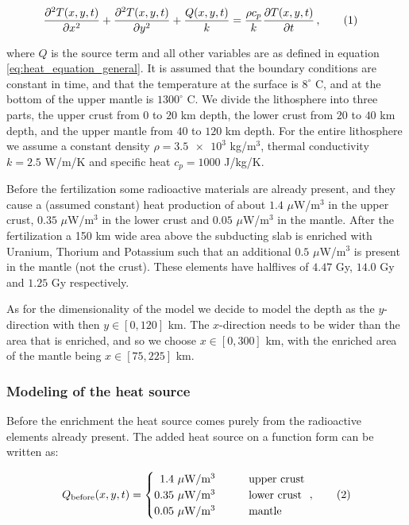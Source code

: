 \documentclass[reprint,english,notitlepage]{revtex4-1}  %
\newcommand\numberthis{\addtocounter{equation}{1}\tag{\theequation}}
\begin{document}
\begin{align*}
\frac{\partial^2 T(x,y,t)}{\partial x^2} + \frac{\partial^2 T(x,y,t)}{\partial y^2} + \frac{Q(x,y,t)}{k} &= \frac{\rho c_p}{k} \frac{\partial T(x,y,t)}{\partial t} \, , \numberthis \label{eq:heat_eq_with_source_term}
\end{align*} 

where $Q$ is the source term and all other variables are as defined in equation \eqref{eq:heat_equation_general}. It is assumed that the boundary conditions are constant in time, and that the temperature at the surface is $8^\circ$ C, and at the bottom of the upper mantle is $1300^\circ$ C. We divide the lithosphere into three parts, the upper crust from $0$ to $20$ km depth, the lower crust from $20$ to $40$ km depth, and the upper mantle from $40$ to $120$ km depth. For the entire lithosphere we assume a constant density $\rho = \num{3.5e3}$ kg/m$^3$, thermal conductivity $k = 2.5$ W/m/K and specific heat $c_p = 1000$ J/kg/K.

Before the fertilization some radioactive materials are already present, and they cause a (assumed constant) heat production of about $1.4$ $\mu$W/m$^3$ in the upper crust, $0.35$ $\mu$W/m$^3$ in the lower crust and $0.05$ $\mu$W/m$^3$ in the mantle. After the fertilization a 150 km wide area above the subducting slab is enriched with Uranium, Thorium and Potassium such that an additional $0.5$ $\mu$W/m$^3$ is present in the mantle (not the crust). These elements have halflives of $4.47$ Gy, $14.0$ Gy and $1.25$ Gy respectively.

As for the dimensionality of the model we decide to model the depth as the $y$-direction with then $y \in [0,120]$ km. The $x$-direction needs to be wider than the area that is enriched, and so we choose $x \in [0,300]$ km, with the enriched area of the mantle being $x \in [75,225]$ km. 


\subsubsection{Modeling of the heat source} \label{sec:formalism_heat_source_model}

Before the enrichment the heat source comes purely from the radioactive elements already present. The added heat source on a function form can be written as:

\begin{align*}
Q_\text{before}(x,y,t) = \begin{cases}
\,\,\, 1.4 \text{ $\mu$W/m$^3$} \quad  \quad  &\text{upper crust} \\
0.35 \text{ $\mu$W/m$^3$} \quad  \quad &\text{lower crust} \\
0.05 \text{ $\mu$W/m$^3$} \quad  \quad &\text{mantle}
\end{cases} \, , \numberthis \label{eq:unfertilized_heat}
\end{align*}
\end{document}
